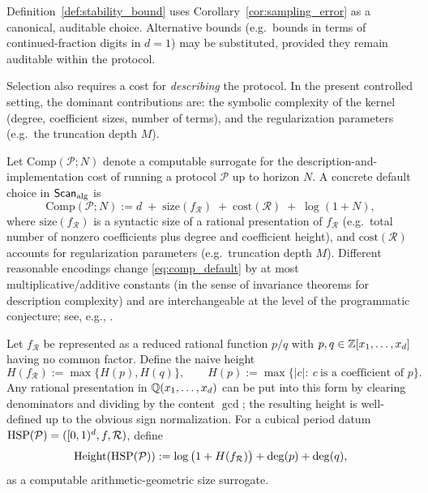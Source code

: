 Definition~\ref{def:stability_bound} uses Corollary~\ref{cor:sampling_error} as a canonical, auditable choice. Alternative bounds (e.g.\ bounds in terms of continued-fraction digits in $d=1$) may be substituted, provided they remain auditable within the protocol.

Selection also requires a cost for \emph{describing} the protocol. In the present controlled setting, the dominant contributions are: the symbolic complexity of the kernel (degree, coefficient sizes, number of terms), and the regularization parameters (e.g.\ the truncation depth $M$).

\begin{definition}
\label{def:protocol_complexity}
Let $\mathrm{Comp}(\mathcal{P};N)$ denote a computable surrogate for the description-and-implementation cost of running a protocol $\mathcal{P}$ up to horizon $N$. A concrete default choice in $\mathsf{Scan}_{\mathrm{alg}}$ is
\begin{equation}
\label{eq:comp_default}
\mathrm{Comp}(\mathcal{P};N)
:=
d
\;+\;
\mathrm{size}(f_{\mathcal{R}})
\;+\;
\mathrm{cost}(\mathcal{R})
\;+\;
\log(1+N),
\end{equation}
where $\mathrm{size}(f_{\mathcal{R}})$ is a syntactic size of a rational presentation of $f_{\mathcal{R}}$ (e.g.\ total number of nonzero coefficients plus degree and coefficient height), and $\mathrm{cost}(\mathcal{R})$ accounts for regularization parameters (e.g.\ truncation depth $M$). Different reasonable encodings change \eqref{eq:comp_default} by at most multiplicative/additive constants (in the sense of invariance theorems for description complexity) and are interchangeable at the level of the programmatic conjecture; see, e.g., \cite{LiVitanyi2008}.
\end{definition}

\begin{definition}
\label{def:naive_height}
Let $f_{\mathcal{R}}$ be represented as a reduced rational function $p/q$ with $p,q\in\mathbb{Z}[x_1,\dots,x_d]$ having no common factor. Define the naive height
\begin{equation}
\label{eq:naive_height}
H(f_{\mathcal{R}}):=\max\{H(p),H(q)\},
\qquad
H(p):=\max\{|c|:\ c\ \text{is a coefficient of }p\}.
\end{equation}
Any rational presentation in $\mathbb{Q}(x_1,\dots,x_d)$ can be put into this form by clearing denominators and dividing by the content $\gcd$; the resulting height is well-defined up to the obvious sign normalization.
For a cubical period datum $\mathrm{HSP}(\mathcal{P})=([0,1)^d,f,\mathcal{R})$, define
\begin{equation}
\label{eq:height_default}
\mathrm{Height}(\mathrm{HSP}(\mathcal{P}))
:=\log\big(1+H(f_{\mathcal{R}})\big)+\deg(p)+\deg(q),
\end{equation}
as a computable arithmetic-geometric size surrogate.
\end{definition}

